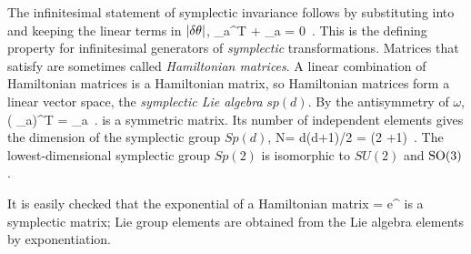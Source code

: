 The infinitesimal statement of symplectic invariance follows by
substituting  into  and keeping
the linear terms in $|\delta \theta|$,
\beq
 \Lg_a^T {\bf \omega} + {\bf \omega} \Lg_a = 0
\,.
This is the defining property for infinitesimal generators of {\em
symplectic} transformations. Matrices that satisfy  are
sometimes called \emph{Hamiltonian matrices}. A linear combination  of
Hamiltonian matrices is a Hamiltonian matrix, so Hamiltonian matrices
form a linear vector space, the \emph{symplectic
Lie algebra} $sp(d)$. By the antisymmetry of $\omega$,
\beq
({\bf \omega} \Lg_a)^T = {\bf \omega} \Lg_a
\,.
is a symmetric matrix. Its number of independent elements gives the
dimension of the symplectic group $Sp(d)$,
\beq
N= {d(d+1)}/{2} = \DOF (2 \DOF+1)
\,.
The lowest-dimensional symplectic group $Sp(2)$ is isomorphic to $SU(2)$
and $\textrm{SO}(3)$.

It is easily checked that the exponential of a Hamiltonian matrix
\beq
\LieEl = e^{\gSpace \cdot {\Lg}}
is a symplectic matrix; Lie group elements are obtained from the Lie
algebra elements by exponentiation.


